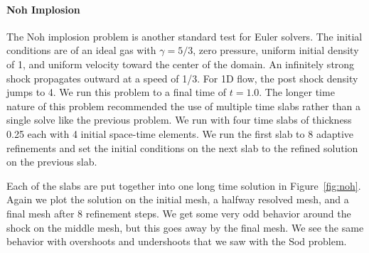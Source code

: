 \documentclass[preprint,12pt]{elsarticle}
\begin{document}
\paragraph{Noh Implosion}
The Noh implosion problem\cite{Noh1987} is another standard test for Euler solvers.
The initial conditions are of an ideal gas with $\gamma=5/3$, zero pressure, uniform initial density of 1, 
and uniform velocity toward the center of the domain.
An infinitely strong shock propagates outward at a speed of 1/3.
For 1D flow, the post shock density jumps to 4.
We run this problem to a final time of $t=1.0$.
The longer time nature of this problem recommended the use of multiple time slabs rather than a single solve like the previous problem.
We run with four time slabs of thickness 0.25 each with 4 initial space-time elements.
We run the first slab to 8 adaptive refinements and set the initial conditions on the next slab to the refined solution on the previous slab.

Each of the slabs are put together into one long time solution in Figure~\ref{fig:noh}. 
Again we plot the solution on the initial mesh, a halfway resolved mesh, and a final mesh after 8 refinement steps.
We get some very odd behavior around the shock on the middle mesh, but this goes away by the final mesh.
We see the same behavior with overshoots and undershoots that we saw with the Sod problem. 
\end{document}
